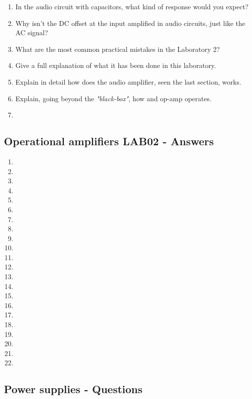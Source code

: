 \documentclass[../main.tex]{subfiles}
\begin{document}
\begin{enumerate}[label=\textbf{\arabic*.}]
	\item In the audio circuit with capacitors, what kind of response would you expect?
	\item Why isn't the DC offset at the input amplified in audio circuits, just like the AC signal?
	\item What are the most common practical mistakes in the Laboratory 2?
	\item Give a full explanation of what it has been done in this laboratory.
	\item Explain in detail how does the audio amplifier, seen the last section, works.
	\item Explain, going beyond the \textit{"black-box"}, how and op-amp operates.
	\item 
\end{enumerate}
\subsection{Operational amplifiers LAB02 - Answers}


\begin{enumerate}[label=\textbf{\arabic*.}]
	\item
	\item
	\item
	\item
	\item
	\item
	\item
	\item
	\item
	\item
	\item
	\item
	\item
	\item
	\item
	\item
	\item
	\item
	\item
	\item
	\item
	\item
\end{enumerate}

\vspace*{1.5cm}
\subsection{Power supplies - Questions}
\end{document}
